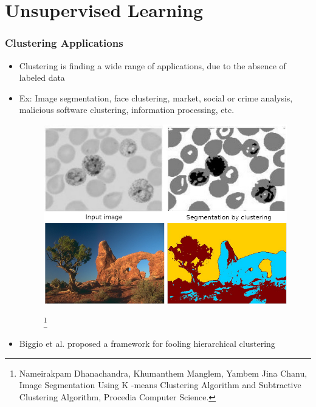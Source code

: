 \documentclass{beamer}
\begin{document}
 
\section{Unsupervised Learning}
\begin{frame}
  \frametitle{Clustering  Applications}
  \changefontsizes{8.5pt}
  \begin{itemize}
  	\item Clustering is finding a wide range of applications, due to the absence of labeled data
  	\item Ex: Image segmentation, face clustering, market, social or crime analysis, malicious software clustering, information processing, etc.
  	
  	\begin{figure}
  		\includegraphics[width= 0.4\linewidth]{img/segmentation2.png}
  		
  		\footnote{\tiny Nameirakpam Dhanachandra, Khumanthem Manglem, Yambem Jina Chanu,
Image Segmentation Using K -means Clustering Algorithm and Subtractive Clustering Algorithm,
Procedia Computer Science.
  	}
  	\end{figure}
  	
  	\item Biggio et al. proposed a framework for fooling hierarchical clustering
  \end{itemize}
\end{frame}
\end{document}
